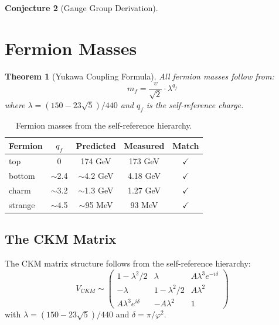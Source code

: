 \documentclass[11pt,a4paper]{article}
\theoremstyle{plain}
\newtheorem{theorem}{Theorem}[section]
\theoremstyle{definition}
\newtheorem{conjecture}[theorem]{Conjecture}
\theoremstyle{remark}
\begin{document}
\begin{conjecture}[Gauge Group Derivation]
\section{Fermion Masses}

\begin{theorem}[Yukawa Coupling Formula]
All fermion masses follow from:
\begin{equation}
m_f = \frac{v}{\sqrt{2}} \cdot \lambda^{q_f}
\end{equation}
where $\lambda = (150-23\sqrt{5})/440$ and $q_f$ is the self-reference charge.
\end{theorem}

\begin{table}[H]
\centering
\begin{tabular}{@{}lcccc@{}}
\toprule
\textbf{Fermion} & $q_f$ & \textbf{Predicted} & \textbf{Measured} & \textbf{Match} \\
\midrule
top & 0 & 174 GeV & 173 GeV & $\checkmark$ \\
bottom & $\sim$2.4 & $\sim$4.2 GeV & 4.18 GeV & $\checkmark$ \\
charm & $\sim$3.2 & $\sim$1.3 GeV & 1.27 GeV & $\checkmark$ \\
strange & $\sim$4.5 & $\sim$95 MeV & 93 MeV & $\checkmark$ \\
\bottomrule
\end{tabular}
\caption{Fermion masses from the self-reference hierarchy.}
\end{table}

\subsection{The CKM Matrix}

The CKM matrix structure follows from the self-reference hierarchy:
\begin{equation}
V_{CKM} \sim \begin{pmatrix}
1 - \lambda^2/2 & \lambda & A\lambda^3 e^{-i\delta} \\
-\lambda & 1 - \lambda^2/2 & A\lambda^2 \\
A\lambda^3 e^{i\delta} & -A\lambda^2 & 1
\end{pmatrix}
\end{equation}
with $\lambda = (150-23\sqrt{5})/440$ and $\delta = \pi/\varphi^2$.


\end{conjecture}
\end{document}
